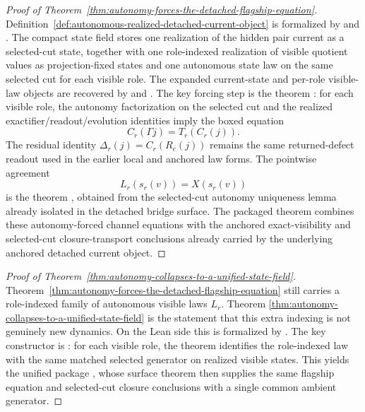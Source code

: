 \begin{proof}[Proof of Theorem~\ref{thm:autonomy-forces-the-detached-flagship-equation}]
\label{proof:thm:autonomy-forces-the-detached-flagship-equation}
Definition~\ref{def:autonomous-realized-detached-current-object} is formalized
by  and
. The compact state field
stores one realization of the hidden pair current as a selected-cut state,
together with one role-indexed realization of visible quotient values as
projection-fixed states and one autonomous state law on the same selected cut
for each visible role. The expanded current-state and per-role visible-law
objects are recovered by
 and
. The key forcing
step is the theorem :
for each visible role, the autonomy factorization on the selected cut and the
realized exactifier/readout/evolution identities imply the boxed equation
\[
C_r(\Gamma j)=T_r(C_r(j)).
\]
The residual identity \(\Delta_r(j)=C_r(R_e(j))\) remains the same
returned-defect readout used in the earlier local and anchored law forms. The
pointwise agreement
\[
L_r(s_r(v))=X(s_r(v))
\]
is the theorem ,
obtained from the selected-cut autonomy uniqueness lemma already isolated in
the detached bridge surface. The packaged theorem
 combines these
autonomy-forced channel equations with the anchored exact-visibility and
selected-cut closure-transport conclusions already carried by the underlying
anchored detached current object.
\end{proof}

\begin{proof}[Proof of Theorem~\ref{thm:autonomy-collapses-to-a-unified-state-field}]
\label{proof:thm:autonomy-collapses-to-a-unified-state-field}
Theorem~\ref{thm:autonomy-forces-the-detached-flagship-equation} still carries a
role-indexed family of autonomous visible laws \(L_r\). Theorem
\ref{thm:autonomy-collapses-to-a-unified-state-field} is the statement that
this extra indexing is not genuinely new dynamics. On the Lean side this is
formalized by
. The key
constructor is
: for each visible
role, the theorem
 identifies
the role-indexed law with the same matched selected generator on realized
visible states. This yields the unified package
, whose surface theorem then
supplies the same flagship equation and selected-cut closure conclusions with a
single common ambient generator.
\end{proof}

